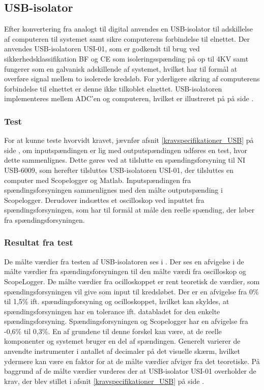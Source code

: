 \subsection{USB-isolator}
Efter konvertering fra analogt til digital anvendes en USB-isolator til adskillelse af computeren til systemet samt sikre computerens forbindelse til elnettet. 
Der anvendes USB-isolatoren USI-01, som er godkendt til brug ved sikkerhedsklassifikation BF og CE som isoleringsspænding på op til 4KV samt fungerer som en galvanisk adskillende af systemet, hvilket har til formål at overføre signal mellem to isolerede kredsløb. For yderligere sikring af computerens forbindelse til elnettet er denne ikke tilkoblet elnettet. USB-isolatoren implementeres mellem ADC'en og computeren, hvilket er illustreret på  på side \pageref{kravblok}.

\subsubsection{Test}
For at kunne teste hvorvidt kravet, jævnfør afsnit \ref{kravspecifikationer_USB} på side \pageref{kravspecifikationer_USB}, om inputspændingen er lig med outputspændingen udføres en test, hvor dette sammenlignes. Dette gøres ved at tilslutte en spændingsforsyning til NI USB-6009, som herefter tilsluttes USB-isolatoren USI-01, der tilsluttes en computer med Scopelogger og Matlab. Inputspændingen fra spændingsforsyningen sammenlignes med den målte outputspænding i Scopelogger. Derudover indsættes et oscilloskop ved inputtet fra spændingsforsyningen, som har til formål at måle den reelle spænding, der løber fra spændingsforsyningen. 

\subsubsection{Resultat fra test}
De målte værdier fra testen af USB-isolatoren ses i . Der ses en afvigelse i de målte værdier fra spændingsforsyningen til den målte værdi fra oscilloskop og ScopeLogger. De målte værdier fra ocilloskoppet er rent teoretisk de værdier, som spændingsforsyningen vil give som input til kredsløbet. Der er en afvigelse fra 0\% til 1,5\% ift. spændingsforsyning og ocilloskoppet, hvilket kan skyldes, at spændingsforsyningen har en tolerance ift. databladet for den enkelte spændingsforsyning. Spændingsforsyningen og Scopelogger har en afvigelse fra -0,6\% til 0,3\%. En af grundene til denne forskel kan være, at de reelle komponenter og systemet bruger en del af spændingen. Generelt varierer de anvendte instrumenter i antallet af decimaler på det visuelle skærm, hvilket ydermere kan være en faktor for at de målte værdier afviger fra det teoretiske. På baggrund af de målte værdier vurderes der at USB-isolator USI-01 overholder de krav, der blev stillet i afsnit \ref{kravspecifikationer_USB} på side \pageref{kravspecifikationer_USB}.

